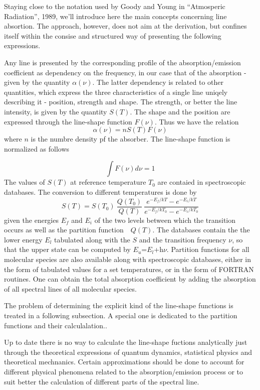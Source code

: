  
Staying close to the notation used by Goody and Young in ``Atmosperic
Radiation'', 1989, we'll introduce here the main concepts concerning
line absortion. The approach, however, does not aim  at the
derivation, but confines itself within the consise and structured way
of presenting the following expressions.

Any line is presented by the corresponding profile of the absorption/emission
coefficient as dependency on the frequency, in our case that of the
absorption - given by the quantity $\alpha(\nu)$. The latter dependency
is related to other quantities, which express the three
characteristics of a single line uniqely describing it - position,
strength and shape. 
The strength, or better the line intensity, is given by the quantity
$S(T)$. The shape and the position are expressed through the
line-shape function $F(\nu)$. Thus we have the relation 
\begin{equation}
  \alpha(\nu)=nS(T)F(\nu)
\label{}
\end{equation} 
where $n$ is the numbre density pf the absorber. The line-shape
function is normalized as follows

\begin{equation}
  \int F(\nu)d\nu=1
\label{}
\end{equation}
The values of $S(T)$ at reference temperature $T_0$ are contaied in spectroscopic databases. The conversion to different
temperatures is done by
\begin{equation}
S(T)=S(T_0)~\frac{Q(T_0)}{Q(T)}~\frac{e^{-E_f/kT} - e^{-E_i/kT}}{e^{-E_f/kT_0} - e^{-E_i/kT_0}}
\label{}
\end{equation}
given the energies $E_f$ and $E_i$ of the two levels between which the
transition occurs as well as the partition function~~$Q(T)$. The
databases contain the the lower energy $E_l$ tabulated along with the
$S$ and the transition frequency $\nu$, so that the upper state can be
computed by $E_u$=$E_l$+h$\nu$. Partition functions for all molecular species are also
available along with spectroscopic databases, either in the form of tabulated values for a set
temperatures, or in the form of FORTRAN routines. One can obtain the total absorption
coefficient by adding the absorption of all spectral lines of all
molecular species.

The problem of determining the explicit kind of the line-shape
functions is treated in a following subsection. A special one is
dedicated to the partition functions and their calculalation..


Up to date there is no way to calculate the line-shape fuctions
analytically just through the theoretical expressions of quantum dynamics,
statistical physics and theoretical mechnanics. Certain approximations
should be done to account for different physical phenomena related to
the absorption/emission process or to suit better the calculation of
different parts of the spectral line.

